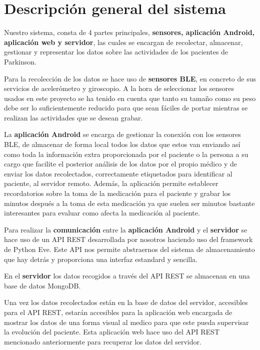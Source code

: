 \documentclass[11pt,spanish]{article}
\begin{document}
\section{Descripción general del sistema}
Nuestro sistema, consta de 4 partes principales, \textbf{sensores, aplicación Android, aplicación web y servidor}, las cuales se encargan de recolectar, almacenar, gestionar y representar los datos sobre las actividades de los pacientes de Parkinson.
\newline

Para la recolección de los datos se hace uso de \textbf{sensores BLE}, en concreto de sus servicios de acelerómetro y giroscopio. A la hora de seleccionar los sensores usados en este proyecto se ha tenido en cuenta que tanto su tamaño como su peso debe ser lo suficientemente reducido para que sean fáciles de portar mientras se realizan las actividades que se desean grabar.
\newline

La \textbf{aplicación Android} se encarga de gestionar la conexión con los sensores BLE, de almacenar de forma local todos los datos que estos van enviando así como toda la información extra proporcionada por el paciente o la persona a su cargo que facilite el posterior análisis de los datos por el propio médico y de enviar los datos recolectados, correctamente etiquetados para identificar al paciente, al servidor remoto. Además, la aplicación permite establecer recordatorios sobre la toma de la medicación para el paciente y grabar los minutos después a la toma de esta medicación ya que suelen ser minutos bastante interesantes para evaluar como afecta la medicación al paciente.
\newline

Para realizar la \textbf{comunicación} entre la \textbf{aplicación Android} y el \textbf{servidor} se hace uso de un API REST desarrollada por nosotros haciendo uso del framework de Python Eve. Este API nos permite abstraernos del sistema de almacenamiento que hay detrás y proporciona una interfaz estandard y sencilla.
\newline

En el \textbf{servidor} los datos recogidos a través del API REST se almacenan en una base de datos MongoDB.
\newline

Una vez los datos recolectados están en la base de datos del servidor, accesibles para el API REST, estarán accesibles para la aplicación web encargada de mostrar los datos de una forma visual al medico para que este pueda supervisar la evolución del paciente. Esta aplicación web hace uso del API REST mencionado anteriormente para recuperar los datos del servidor.
\newline
\end{document}
